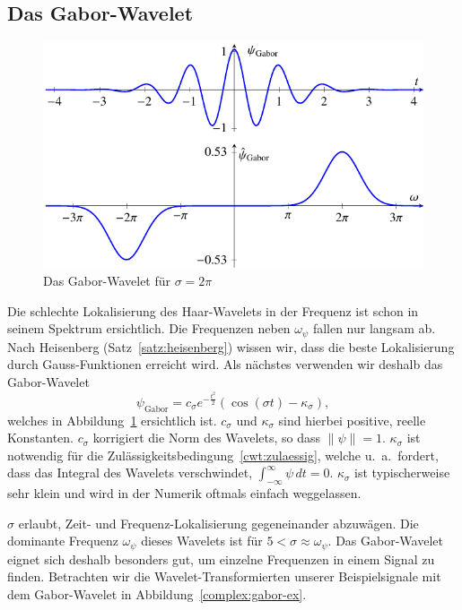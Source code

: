 \subsection{Das Gabor-Wavelet}
\begin{figure}
	\centering
	\includegraphics{papers/complex/images/gabor.pdf}
	\caption{Das Gabor-Wavelet für $\sigma = 2\pi$ \label{complex:gabor}}
\end{figure}

Die schlechte Lokalisierung des Haar-Wavelets in der Frequenz ist schon in seinem Spektrum ersichtlich.
Die Frequenzen neben $\omega_\psi$ fallen nur langsam ab.
Nach Heisenberg (Satz~\ref{satz:heisenberg}) wissen wir, dass die beste Lokalisierung durch Gauss-Funktionen erreicht wird.
Als nächstes verwenden wir deshalb das Gabor-Wavelet
\[
	\psi_\text{Gabor} = c_\sigma e^{-\frac{t^2}{2}}\left(\cos\left(\sigma t\right) - \kappa_\sigma\right),
\]
welches in Abbildung~\ref{complex:gabor} ersichtlich ist.
$c_\sigma$ und $\kappa_\sigma$ sind hierbei positive, reelle Konstanten.
$c_\sigma$ korrigiert die Norm des Wavelets, so dass $\|\psi\| = 1$.
$\kappa_\sigma$ ist notwendig für die Zulässigkeitsbedingung~\eqref{cwt:zulaessig}, welche u.~a.~fordert, dass das Integral des Wavelets verschwindet,  $\int_{-\infty}^{\infty}\psi\,dt = 0$.
$\kappa_\sigma$ ist typischerweise sehr klein und wird in der Numerik oftmals einfach weggelassen.

$\sigma$ erlaubt, Zeit- und Frequenz-Lokalisierung gegeneinander abzuwägen.
Die dominante Frequenz $\omega_\psi$ dieses Wavelets ist für $5 < \sigma \approx \omega_\psi$.
Das Gabor-Wavelet eignet sich deshalb besonders gut, um einzelne Frequenzen in einem Signal zu finden.
Betrachten wir die Wavelet-Transformierten unserer Beispielsignale mit dem Gabor-Wavelet in Abbildung~\ref{complex:gabor-ex}.

